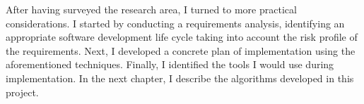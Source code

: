 After having surveyed the research area, I turned to more practical considerations. I started by conducting a requirements analysis, identifying an appropriate software development life cycle taking into account the risk profile of the requirements. Next, I developed a concrete plan of implementation using the aforementioned techniques. Finally, I identified the tools I would use during implementation. In the next chapter, I describe the algorithms developed in this project.